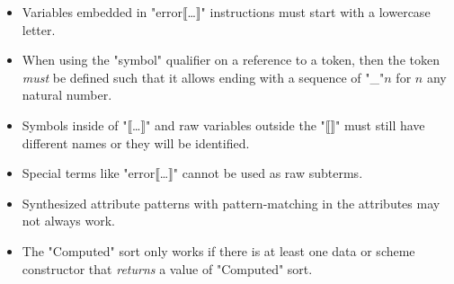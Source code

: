 \documentclass[11pt]{article} %
\begin{document}
\begin{itemize}
\item Variables embedded in "error⟦…⟧" instructions must start with a lowercase letter.

\item When using the "symbol" qualifier on a reference to a token, then the token \emph{must} be
  defined such that it allows ending with a sequence of "_"$n$ for $n$ any natural number.

\item Symbols inside of "⟦…⟧" and raw variables outside the "⟦⟧" must still have different names or
  they will be identified.

\item Special terms like "error⟦…⟧" cannot be used as raw subterms.

\item Synthesized attribute patterns with pattern-matching in the attributes may not always work.

\item The "Computed" sort only works if there is at least one data or scheme constructor that
  \emph{returns} a value of "Computed" sort.

\end{itemize}



\end{document}
